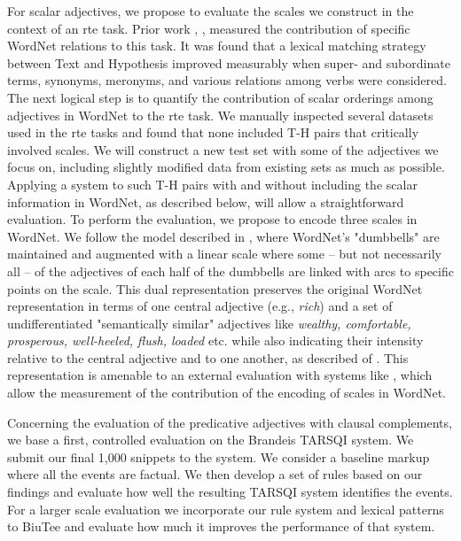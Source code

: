 \documentclass[10pt]{article}
\begin{document}
For scalar adjectives, we propose to evaluate the scales we construct in the context of an {\sc rte} task. Prior work \cite{clark2007role},
\cite{clark2008augmenting}, \cite{clark2008using} measured the contribution of specific WordNet relations 
to this task. It was found that a lexical matching strategy between Text and Hypothesis improved measurably when 
super- and subordinate terms, synonyms, meronyms, and various relations among verbs were considered. 
The next logical step is to quantify the contribution of scalar orderings among 
adjectives in WordNet to the {\sc rte} task.
We manually inspected several datasets used in the {\sc rte} tasks and found that none included T-H pairs that 
critically involved scales. We will construct a new test set with some of the adjectives we focus on, 
including slightly modified data from existing sets as much as possible. Applying a system to such T-H pairs 
with and without including the scalar information in WordNet, as described below, will allow a straightforward 
evaluation. 
To perform the evaluation, we propose to encode three scales in WordNet. We follow the model described in 
\cite{sheinmanetal2013}, where WordNet's "dumbbells" are maintained and augmented with a linear scale where 
some -- but not necessarily all -- of the adjectives of each half of the dumbbells are linked with arcs to specific 
points on the scale. This dual representation preserves the original WordNet representation in terms of one central 
adjective (e.g., \emph{rich}) and a set of undifferentiated "semantically similar" adjectives like \emph{wealthy, comfortable, prosperous, 
well-heeled, flush, loaded} etc. while  also indicating their intensity relative to the central adjective and to one another, as described  of \cite{sheinmanetal2013}. 
This representation is amenable to an external evaluation with systems like \cite{clark2007role}, which allow the measurement of the contribution 
of the encoding of  scales in WordNet.

Concerning the evaluation of the predicative adjectives with clausal complements,  we base a first, controlled evaluation on the Brandeis TARSQI system.  We submit our final 1,000 snippets to the system. We consider a baseline markup where all the events are factual. We then develop a set of rules based on our findings and evaluate how well the resulting TARSQI system identifies the events.  For a larger scale evaluation we incorporate our rule system and lexical patterns to BiuTee and evaluate how much it improves the performance of that system. 
\end{document}
